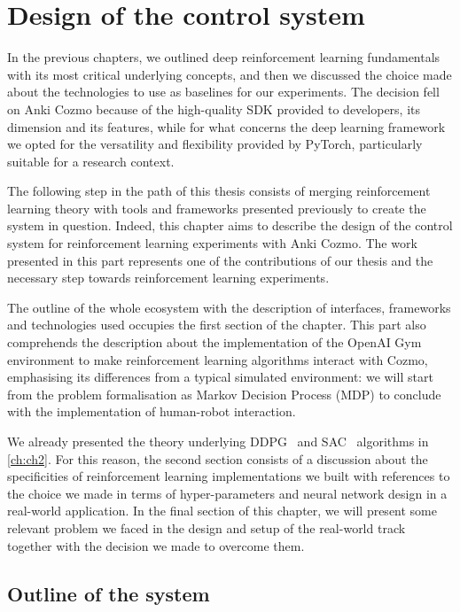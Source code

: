 \chapter{Design of the control system}\label{ch:ch4}

In the previous chapters, we outlined deep reinforcement learning fundamentals with its most critical underlying concepts, and then we discussed the choice made about the technologies to use as baselines for our experiments.
The decision fell on Anki Cozmo because of the high-quality SDK provided to developers, its dimension and its features, while for what concerns the deep learning framework we opted for the versatility and flexibility provided by PyTorch, particularly suitable for a research context.

The following step in the path of this thesis consists of merging reinforcement learning theory with tools and frameworks presented previously to create the system in question.
Indeed, this chapter aims to describe the design of the control system for reinforcement learning experiments with Anki Cozmo.
The work presented in this part represents one of the contributions of our thesis and the necessary step towards reinforcement learning experiments.

The outline of the whole ecosystem with the description of interfaces, frameworks and technologies used occupies the first section of the chapter.
This part also comprehends the description about the implementation of the OpenAI Gym environment to make reinforcement learning algorithms interact with Cozmo, emphasising its differences from a typical simulated environment: we will start from the problem formalisation as Markov Decision Process (MDP) to conclude with the implementation of human-robot interaction.

We already presented the theory underlying DDPG~\cite{lillicrap2015continuous} and SAC~\cite{haarnoja2018soft, haarnoja2018alg} algorithms in \vref{ch:ch2}.
For this reason, the second section consists of a discussion about the specificities of reinforcement learning implementations we built with references to the choice we made in terms of hyper-parameters and neural network design in a real-world application.
In the final section of this chapter, we will present some relevant problem we faced in the design and setup of the real-world track together with the decision we made to overcome them.

\section{Outline of the system}\label{sec:outline-of-the-system}

